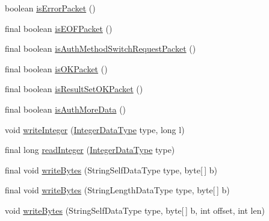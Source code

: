 \begin{DoxyCompactItemize}
boolean \mbox{\hyperlink{classcom_1_1mysql_1_1cj_1_1protocol_1_1a_1_1_native_packet_payload_a4367996e181d7956f2b586c27f1c04ee}{is\+Error\+Packet}} ()
\item 
final boolean \mbox{\hyperlink{classcom_1_1mysql_1_1cj_1_1protocol_1_1a_1_1_native_packet_payload_aebc952e2498deecf37b0b02c313b7bb8}{is\+E\+O\+F\+Packet}} ()
\item 
final boolean \mbox{\hyperlink{classcom_1_1mysql_1_1cj_1_1protocol_1_1a_1_1_native_packet_payload_aa4a35c30b6d281a9aace69b8c2996432}{is\+Auth\+Method\+Switch\+Request\+Packet}} ()
\item 
final boolean \mbox{\hyperlink{classcom_1_1mysql_1_1cj_1_1protocol_1_1a_1_1_native_packet_payload_a0636ef9a0086c5caef961b567fd92f80}{is\+O\+K\+Packet}} ()
\item 
final boolean \mbox{\hyperlink{classcom_1_1mysql_1_1cj_1_1protocol_1_1a_1_1_native_packet_payload_a0066c5b03b5cb03b5178a6927b9b32ee}{is\+Result\+Set\+O\+K\+Packet}} ()
\item 
final boolean \mbox{\hyperlink{classcom_1_1mysql_1_1cj_1_1protocol_1_1a_1_1_native_packet_payload_a54b7b6f463139cb3d33d84212db442d3}{is\+Auth\+More\+Data}} ()
\item 
void \mbox{\hyperlink{classcom_1_1mysql_1_1cj_1_1protocol_1_1a_1_1_native_packet_payload_ad9d225e02fbb482471592f99b5a16958}{write\+Integer}} (\mbox{\hyperlink{enumcom_1_1mysql_1_1cj_1_1protocol_1_1a_1_1_native_constants_1_1_integer_data_type}{Integer\+Data\+Type}} type, long l)
\item 
final long \mbox{\hyperlink{classcom_1_1mysql_1_1cj_1_1protocol_1_1a_1_1_native_packet_payload_a1e4284bb772c7244ad163927017f13dc}{read\+Integer}} (\mbox{\hyperlink{enumcom_1_1mysql_1_1cj_1_1protocol_1_1a_1_1_native_constants_1_1_integer_data_type}{Integer\+Data\+Type}} type)
\item 
final void \mbox{\hyperlink{classcom_1_1mysql_1_1cj_1_1protocol_1_1a_1_1_native_packet_payload_add0512948b6c89c36d0e88b75666e181}{write\+Bytes}} (String\+Self\+Data\+Type type, byte\mbox{[}$\,$\mbox{]} b)
\item 
final void \mbox{\hyperlink{classcom_1_1mysql_1_1cj_1_1protocol_1_1a_1_1_native_packet_payload_a980a8f52827e0084c623c0d0c6b27e5f}{write\+Bytes}} (String\+Length\+Data\+Type type, byte\mbox{[}$\,$\mbox{]} b)
\item 
void \mbox{\hyperlink{classcom_1_1mysql_1_1cj_1_1protocol_1_1a_1_1_native_packet_payload_ac5301ca0c4705a68a1be3815410bef3b}{write\+Bytes}} (String\+Self\+Data\+Type type, byte\mbox{[}$\,$\mbox{]} b, int offset, int len)

\end{DoxyCompactItemize}
